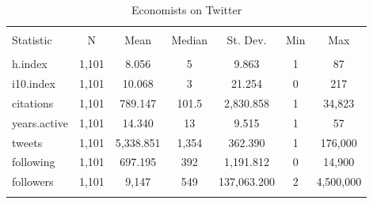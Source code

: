 \documentclass[12pt, Times New Roman]{article}
\begin{document}
\begin{table}[!htbp] \centering 
  \caption{Economists on Twitter} 
  \label{table3} 
\begin{tabular}{@{\extracolsep{5pt}}lcccccc} 
\\[-1.8ex]\hline 
\hline \\[-1.8ex] 
Statistic & \multicolumn{1}{c}{N} & \multicolumn{1}{c}{Mean} & \multicolumn{1}{c}{Median} & \multicolumn{1}{c}{St. Dev.} & \multicolumn{1}{c}{Min} & \multicolumn{1}{c}{Max} \\ 
\hline \\[-1.8ex] 
h.index & 1,101 & 8.056 & 5 & 9.863 & 1 & 87 \\ 
i10.index & 1,101 & 10.068 & 3 & 21.254 & 0 & 217 \\ 
citations & 1,101 & 789.147 & 101.5 & 2,830.858 & 1 & 34,823 \\ 
years.active & 1,101 & 14.340 & 13 & 9.515 & 1 & 57 \\ 
tweets & 1,101 & 5,338.851 & 1,354 & 362.390 & 1 & 176,000 \\ 
following & 1,101 & 697.195 & 392 & 1,191.812 & 0 & 14,900 \\ 
followers & 1,101 & 9,147 & 549 & 137,063.200 & 2 & 4,500,000 \\ 
\hline \\[-1.8ex] 
\end{tabular} 
\end{table}
\end{document}
